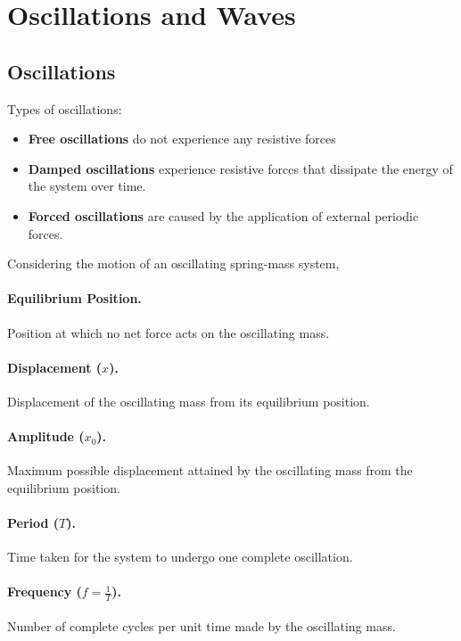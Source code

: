 \documentclass{article}
\begin{document}
\section{Oscillations and Waves}

\subsection{Oscillations}

Types of oscillations: \begin{itemize} \item \textbf{Free oscillations} do not
    experience any resistive forces \item \textbf{Damped oscillations}
    experience resistive forces that dissipate the energy of the system over
  time.  \item \textbf{Forced oscillations} are caused by the application of
    external periodic forces.  \end{itemize}

Considering the motion of an oscillating spring-mass system,

\paragraph{Equilibrium Position.} Position at which no net force acts on the
oscillating mass.

\paragraph{Displacement ($x$).} Displacement of the oscillating mass from its
equilibrium position.

\paragraph{Amplitude ($x_0$).} Maximum possible displacement attained by the
oscillating mass from the equilibrium position.

\paragraph{Period ($T$).} Time taken for the system to undergo one complete
oscillation.

\paragraph{Frequency ($f = \frac{1}{T}$).} Number of complete cycles per unit
time made by the oscillating mass.
\end{document}
